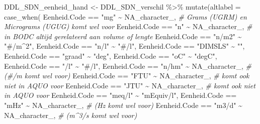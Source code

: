 \documentclass[
]{book}
\newenvironment{Shaded}{\begin{snugshade}}{\end{snugshade}}
\newcommand{\AttributeTok}[1]{\textcolor[rgb]{0.77,0.63,0.00}{#1}}
\newcommand{\CommentTok}[1]{\textcolor[rgb]{0.56,0.35,0.01}{\textit{#1}}}
\newcommand{\ConstantTok}[1]{\textcolor[rgb]{0.00,0.00,0.00}{#1}}
\newcommand{\FunctionTok}[1]{\textcolor[rgb]{0.00,0.00,0.00}{#1}}
\newcommand{\NormalTok}[1]{#1}
\newcommand{\OtherTok}[1]{\textcolor[rgb]{0.56,0.35,0.01}{#1}}
\newcommand{\SpecialCharTok}[1]{\textcolor[rgb]{0.00,0.00,0.00}{#1}}
\newcommand{\StringTok}[1]{\textcolor[rgb]{0.31,0.60,0.02}{#1}}
\begin{document}
\begin{Shaded}
\begin{Highlighting}[]
\NormalTok{DDL\_SDN\_eenheid\_hand }\OtherTok{\textless{}{-}}\NormalTok{ DDL\_SDN\_verschil }\SpecialCharTok{\%\textgreater{}\%}
  \FunctionTok{mutate}\NormalTok{(}\AttributeTok{altlabel =} 
           \FunctionTok{case\_when}\NormalTok{(}
\NormalTok{             Eenheid.Code }\SpecialCharTok{==} \StringTok{"mg"} \SpecialCharTok{\textasciitilde{}} \ConstantTok{NA\_character\_}\NormalTok{, }\CommentTok{\# Grams (UGRM) en Micrograms (UGUG) komt wel voor}
\NormalTok{             Eenheid.Code }\SpecialCharTok{==} \StringTok{"n"} \SpecialCharTok{\textasciitilde{}} \ConstantTok{NA\_character\_}\NormalTok{, }\CommentTok{\# in BODC altijd gerelateerd aan volume of lengte}
\NormalTok{             Eenheid.Code }\SpecialCharTok{==} \StringTok{"n/m2"} \SpecialCharTok{\textasciitilde{}} \StringTok{"\#/m\^{}2"}\NormalTok{,}
\NormalTok{             Eenheid.Code }\SpecialCharTok{==} \StringTok{"n/l"} \SpecialCharTok{\textasciitilde{}} \StringTok{"\#/l"}\NormalTok{,}
\NormalTok{             Eenheid.Code }\SpecialCharTok{==} \StringTok{"DIMSLS"} \SpecialCharTok{\textasciitilde{}} \StringTok{""}\NormalTok{,}
\NormalTok{             Eenheid.Code }\SpecialCharTok{==} \StringTok{"graad"} \SpecialCharTok{\textasciitilde{}} \StringTok{"deg"}\NormalTok{,}
\NormalTok{             Eenheid.Code }\SpecialCharTok{==} \StringTok{"oC"} \SpecialCharTok{\textasciitilde{}} \StringTok{"degC"}\NormalTok{,}
\NormalTok{             Eenheid.Code }\SpecialCharTok{==} \StringTok{"/l"} \SpecialCharTok{\textasciitilde{}} \StringTok{"\#/l"}\NormalTok{,}
\NormalTok{             Eenheid.Code }\SpecialCharTok{==} \StringTok{"n/hm"} \SpecialCharTok{\textasciitilde{}} \ConstantTok{NA\_character\_}\NormalTok{, }\CommentTok{\# (\#/m komt wel voor)}
\NormalTok{             Eenheid.Code }\SpecialCharTok{==} \StringTok{"FTU"} \SpecialCharTok{\textasciitilde{}} \ConstantTok{NA\_character\_}\NormalTok{, }\CommentTok{\# komt ook niet in AQUO voor}
\NormalTok{             Eenheid.Code }\SpecialCharTok{==} \StringTok{"JTU"} \SpecialCharTok{\textasciitilde{}} \ConstantTok{NA\_character\_}\NormalTok{, }\CommentTok{\# komt ook niet in AQUO voor}
\NormalTok{             Eenheid.Code }\SpecialCharTok{==} \StringTok{"meq/l"} \SpecialCharTok{\textasciitilde{}} \StringTok{"mEquiv/l"}\NormalTok{,}
\NormalTok{             Eenheid.Code }\SpecialCharTok{==} \StringTok{"mHz"} \SpecialCharTok{\textasciitilde{}} \ConstantTok{NA\_character\_}\NormalTok{, }\CommentTok{\# (Hz komt wel voor)}
\NormalTok{             Eenheid.Code }\SpecialCharTok{==} \StringTok{"m3/d"} \SpecialCharTok{\textasciitilde{}} \ConstantTok{NA\_character\_}\NormalTok{,  }\CommentTok{\# (m\^{}3/s komt wel voor)}

\end{Highlighting}
\end{Shaded}
\end{document}
